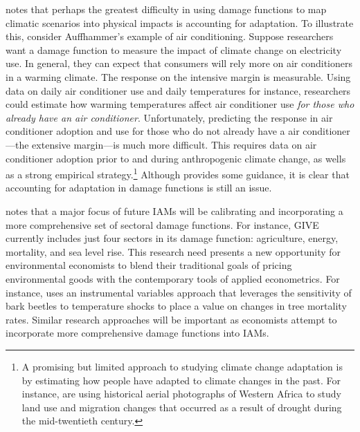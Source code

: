 \cite{auffhammer2018quantifying} notes that perhaps the greatest difficulty in using damage functions to map climatic scenarios into physical impacts is accounting for adaptation. To illustrate this, consider Auffhammer's example of air conditioning. Suppose researchers want a damage function to measure the impact of climate change on electricity use. In general, they can expect that consumers will rely more on air conditioners in a warming climate. The response on the intensive margin is measurable. Using data on daily air conditioner use and daily temperatures for instance, researchers could estimate how warming temperatures affect air conditioner use \emph{for those who already have an air conditioner}. Unfortunately, predicting the response in air conditioner adoption and use for those who do not already have a air conditioner---the extensive margin---is much more difficult. This requires data on air conditioner adoption prior to and during anthropogenic climate change, as wells as a strong empirical strategy.\footnote{A promising but limited approach to studying climate change adaptation is by estimating how people have adapted to climate changes in the past. For instance, \cite{druckenmiller2023air} are using historical aerial photographs of Western Africa to study land use and migration changes that occurred as a result of drought during the mid-twentieth century.} Although \cite{auffhammer2018quantifying} provides some guidance, it is clear that accounting for adaptation in damage functions is still an issue. 

\cite{auffhammer2022more} notes that a major focus of future IAMs will be calibrating and incorporating a more comprehensive set of sectoral damage functions. For instance, GIVE currently includes just four sectors in its damage function: agriculture, energy, mortality, and sea level rise. This research need presents a new opportunity for environmental economists to blend their traditional goals of pricing environmental goods with the contemporary tools of applied econometrics. For instance, \cite{druckenmiller2020tree} uses an instrumental variables approach that leverages the sensitivity of bark beetles to temperature shocks to place a value on changes in tree mortality rates. Similar research approaches will be important as economists attempt to incorporate more comprehensive damage functions into IAMs. 

